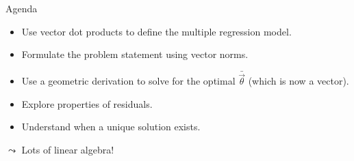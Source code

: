 \documentclass[aspectratio=169]{../latex_main/tntbeamer}  %
\begin{document}
    
    \begin{frame}[c]{Agenda}
       \begin{itemize}
           \item Use vector dot products to define the multiple regression model.
           \item Formulate the problem statement using vector norms.
           \item Use a geometric derivation to solve for the optimal $\bar{\vec{\theta}}$ (which is now a vector).
           \item Explore properties of residuals.
           \item Understand when a unique solution exists.
       \end{itemize}
       $\leadsto$ Lots of linear algebra! 
    \end{frame}
\end{document}
